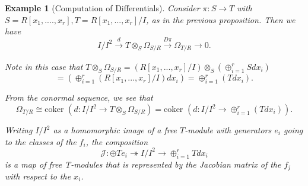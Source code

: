 \documentclass{beamer}
\newtheorem{ex}{Example}
\begin{document}
\begin{frame}
\begin{small}
\begin{ex}[Computation of Differentials]





Consider $\pi:S\to T$ with $S = R[x_1,....,x_r], T = R[x_1,...,x_r]/I$,  as in the previous proposition. Then we have
$$I/I^2\xrightarrow[\text{}]{d}T\otimes_S\Omega_{S/R}\xrightarrow[\text{}]{D\pi}\Omega_{T/R}\xrightarrow{}{} 0.$$

Note in this case that $T\otimes_{S}\Omega_{S/R} = (R[x_1,...,x_r]/I)\otimes_{S}(\oplus_{i=1}^rSdx_i)$
$$= (\oplus_{i=1}^r(R[x_1,...,x_r]/I)dx_i) = \oplus_{i=1}^r(Tdx_i).$$

From the conormal sequence, we see that 
$$\Omega_{T/R}\cong\text{coker }(d:I/I^2\to T\otimes_{S}\Omega_{S/R}) = \text{coker }(d:I/I^2\to \oplus_{i=1}^r(Tdx_i)).$$

Writing $I/I^2$ as a homomorphic image of a free $T$-module with generators $e_i$ going to the classes of the $f_i$, the composition
$$\mathcal{J}:\oplus Te_i\twoheadrightarrow I/I^2\to\oplus_{i=1}^rTdx_i$$
is a map of free T-modules that is represented by the Jacobian matrix of the $f_j$ with respect to the $x_i$.

\end{ex}

\end{small}
\end{frame}


\end{document}
